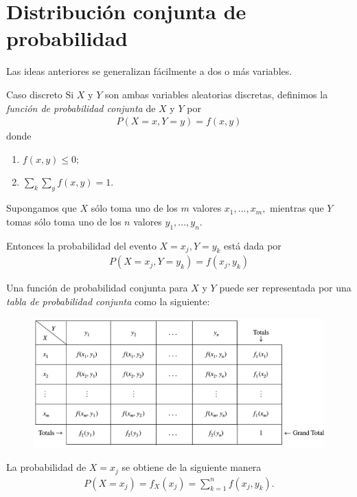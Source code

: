 \section{Distribución conjunta de probabilidad}


	Las ideas anteriores se generalizan fácilmente a dos o más variables.


{Caso discreto}
	Si $X$ y $Y$ son ambas variables aleatorias discretas, definimos la \emph{función de probabilidad conjunta} de $X$ y $Y$ por
	\begin{align}
	\label{2.13}
		P(X=x, Y=y)=f(x,y)
	\end{align}
 donde
\begin{enumerate}
	\item $f(x,y)\leq 0;$
	\item $\sum_{k}\sum_{y}f(x,y)=1.$
\end{enumerate}




	Supongamos que $X$ sólo toma uno de los $m$ valores $x_{1},...,x_{m},$ mientras que $Y$ tomas sólo toma uno de los $n$ valores $y_{1},...,y_{n}.$

	Entonces la probabilidad del evento $X=x_{j}, Y=y_{k}$ está dada por
	\begin{align}
	\label{2.14}
		P(X=x_{j}, Y=y_{k})=f(x_{j},y_{k})
	\end{align}



	Una función de probabilidad conjunta para $X$ y $Y$ puede ser representada por una \emph{tabla de probabilidad conjunta} como la siguiente:
	\begin{figure}
	\centering
	\includegraphics[height=5cm,keepaspectratio=true]{./pe/tab0203.png}
	\label{tab:0203}
\end{figure}



	La probabilidad de $X=x_{j}$ se obtiene de la siguiente manera
	\begin{align}
	\label{2.15}
		P(X=x_{j})=f_{X}(x_{j})=\sum_{k=1}^{n}f(x_{j},y_{k}).
	\end{align}



